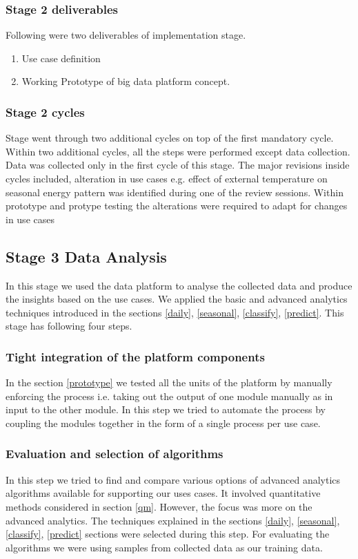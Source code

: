 \subsubsection{Stage 2 deliverables}
Following were two deliverables of implementation stage.
\begin{enumerate}
\item Use case definition
\item Working Prototype of big data platform concept.
\end{enumerate}
\subsubsection{Stage 2 cycles}
Stage went through two additional cycles on top of the first mandatory cycle. Within two additional cycles, all the steps were performed except data collection. Data was collected only in the first cycle of this stage. 
The major revisions inside cycles included, alteration in use cases e.g. effect of external temperature on seasonal energy pattern was identified during one of the review sessions. Within prototype and protype testing the alterations were required to adapt for changes in use cases

\subsection{Stage 3 Data Analysis}
In this stage we used the data platform to analyse the collected data and produce the insights based on the use cases. We applied the basic and advanced analytics techniques introduced in the sections  \ref{daily}, \ref{seasonal}, \ref{classify}, \ref{predict}. This stage has following four steps.
\subsubsection{Tight integration of the platform components}
In the section \ref{prototype} we tested all the units of the platform by manually enforcing the process i.e. taking out the  output of one module manually as in input to the other module. In this step we tried to automate the process by coupling the modules together in the form of a single process per use case. 
\subsubsection{Evaluation and selection of algorithms}\label{eval}
In this step we tried to find and compare various options of advanced analytics algorithms available for supporting our uses cases. It involved quantitative methods considered in section \ref{qm}. However, the focus was more on the advanced analytics. The techniques explained in the sections \ref{daily}, \ref{seasonal},  \ref{classify}, \ref{predict} sections were selected during this step. For evaluating the algorithms we were using samples from collected data as our training data. 

